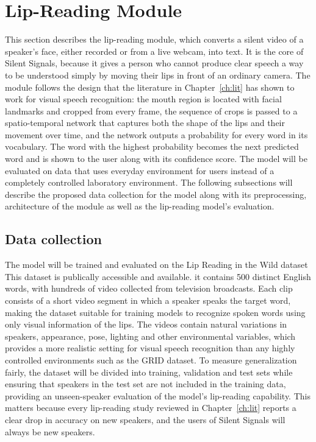 \documentclass{FastFyp}
\begin{document}
\section{Lip-Reading Module}
This section describes the lip-reading module, which converts a silent video of a speaker's face, either recorded or from a live webcam, into text. It is the core of Silent Signals, because it gives a person who cannot produce clear speech a way to be understood simply by moving their lips in front of an ordinary camera. The module follows the design that the literature in Chapter~\ref{ch:lit} has shown to work for visual speech recognition: the mouth region is located with facial landmarks and cropped from every frame, the sequence of crops is passed to a spatio-temporal network that captures both the shape of the lips and their movement over time, and the network outputs a probability for every word in its vocabulary.%
The word with the highest probability becomes the next predicted word and is shown to the user along with its confidence score.
The model will be evaluated on data that uses everyday environment for users instead of a completely controlled laboratory environment. 
The following subsections will describe the proposed data collection for the model along with its preprocessing, architecture of the module as well as the lip-reading model's evaluation.


\subsection{Data collection}
The model will be trained and evaluated on the Lip Reading in the Wild dataset \cite{ref:Chung:2016}
This dataset is publically accessible and available. it contains 500 distinct English words, 
with hundreds of video collected from television broadcasts.
Each clip consists of a short video segment in which a speaker speaks the target word, 
making the dataset suitable for training models to recognize spoken words using only visual information of the lips. 
The videos contain natural variations in speakers, appearance, pose, lighting and other environmental variables, which provides a more realistic setting for visual speech recognition than any highly controlled environments such as the GRID \cite{cooke2006grid} dataset. 
To measure generalization fairly, the dataset will be divided into training, validation and test sets while ensuring that speakers in the test set are not included in the training data, providing an unseen-speaker evaluation of the model's lip-reading capability. This matters because every lip-reading study reviewed in Chapter~\ref{ch:lit} reports a clear drop in accuracy on new speakers, and the users of Silent Signals will always be new speakers.
\end{document}
